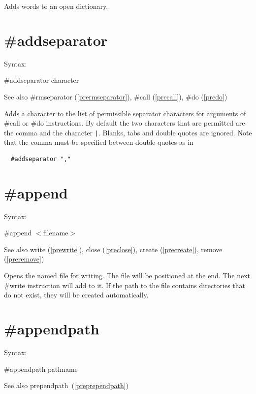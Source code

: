 \noindent Adds words to an open dictionary.

 
\section{\#addseparator}
\label{preaddseparator}

\noindent Syntax:

\#addseparator character
 
\noindent See also \#rmseparator (\ref{prermseparator}),
            \#call (\ref{precall}), \#do (\ref{predo})

\noindent Adds a character to the list of permissible 
separator characters for arguments of \#call or \#do instructions. By 
default the two characters that are permitted are the comma and the 
character \verb:|:. Blanks, tabs and double quotes are ignored. Note that 
the comma must be specified between double quotes as in
\begin{verbatim}
  #addseparator ","
\end{verbatim}


 
\section{\#append}
\label{preappend}

\noindent Syntax:

\#append $<$filename$>$
 
\noindent See also write (\ref{prewrite}),
            close (\ref{preclose}), create (\ref{precreate}),
            remove (\ref{preremove})

\noindent Opens the named file for writing. The file will 
be positioned at the end. The next \#write instruction will 
add to it. If the path to the file contains directories that do not exist, 
they will be created automatically.

 
\section{\#appendpath}
\label{preappendpath}

\noindent Syntax:

\#appendpath pathname

\noindent See also prependpath~(\ref{preprependpath})

